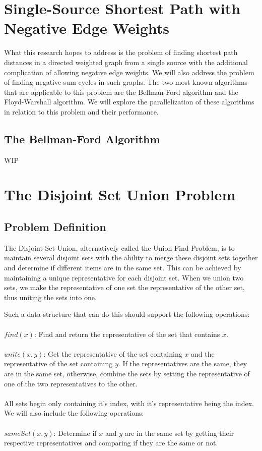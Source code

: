 \documentclass[conference]{IEEEtran}
\begin{document}


\section{Single-Source Shortest Path with Negative Edge Weights}
What this research hopes to address is the problem of finding shortest path distances in a directed weighted graph from a single source with the additional complication of allowing negative edge weights. We will also address the problem of finding negative sum cycles in such graphs. The two most known algorithms that are applicable to this problem are the Bellman-Ford algorithm and the Floyd-Warshall algorithm. We will explore the parallelization of these algorithms in relation to this problem and their performance.

\subsection{The Bellman-Ford Algorithm}\label{AA}
WIP



\section{The Disjoint Set Union Problem}

\subsection{Problem Definition}
The Disjoint Set Union, alternatively called the Union Find Problem, is to maintain several disjoint sets with the ability to merge these disjoint sets together and determine if different items are in the same set. This can be achieved by maintaining a unique representative for each disjoint set. When we union two sets, we make the representative of one set the representative of the other set, thus uniting the sets into one.

Such a data structure that can do this should support the following operations: \\ \\
$find(x)$: Find and return the representative of the set that contains $x$. \\ \\
$unite(x, y)$: Get the representative of the set containing $x$ and the representative of the set containing $y$. If the representatives are the same, they are in the same set, otherwise, combine the sets by setting the representative of one of the two representatives to the other. \\ \\
All sets begin only containing it's index, with it's representative being the index. We will also include the following operations: \\ \\
$sameSet(x, y)$: Determine if $x$ and $y$ are in the same set by getting their respective representatives and comparing if they are the same or not.
\end{document}
